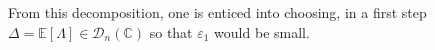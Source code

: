 \documentclass[ECP, preprint]{ejpecp} %
\DeclareMathOperator{\diag}{Diag}
\begin{document}

From this decomposition, one is enticed into choosing, in a first step $\Delta = \mathbb E[\Lambda] \in \mathcal D_n(\mathbb C)$ so that $\varepsilon_1$ would be small. 
\end{document}
